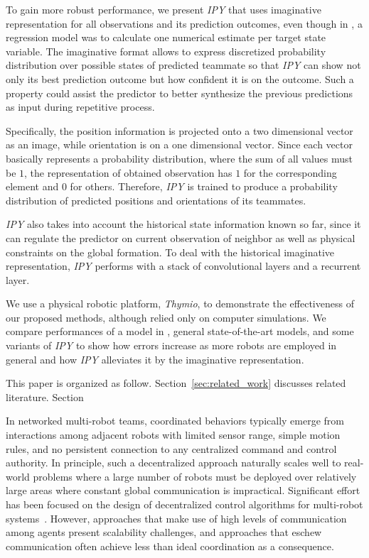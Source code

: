 \documentclass[letterpaper, 10 pt, conference]{ieeeconf}  %
\begin{document}
	To gain more robust performance, we present \emph{IPY} that uses imaginative representation 
	for all observations and its prediction outcomes, even though in \cite{Choi17}, 
	a regression model was to calculate one numerical estimate per target state variable. 
	The imaginative format allows to express discretized probability distribution 
	over possible states of predicted teammate so that \emph{IPY} can show not only its best
	prediction outcome but how confident it is on the outcome. 
	Such a property could assist the predictor to better synthesize the previous predictions as
	input during repetitive process.
	
	Specifically, the position information is projected onto a two
	dimensional vector as an image, while orientation is on a one dimensional vector.
	Since each vector basically represents a probability distribution, where the sum of all values 
	must be $1$, the representation of obtained observation has $1$ for the corresponding element
	and $0$ for others. Therefore, \emph{IPY} is trained to produce a probability distribution of 
	predicted positions and orientations of its teammates. 
	
	\emph{IPY} also takes into account the historical state information known so far, 
	since it can regulate the predictor on current observation of neighbor as well as
	physical constraints on the global formation. To deal with the historical imaginative 
	representation, \emph{IPY} performs with a stack of convolutional layers and a recurrent
	layer. 
		
	We use a physical robotic platform, \emph{Thymio}, to demonstrate the effectiveness of 
	our proposed methods, although \cite{Choi17} relied only on computer simulations.
	We compare performances of a model in \cite{Choi17}, general state-of-the-art models, 
	and some variants of \emph{IPY} to show how errors increase as more robots are employed in 
	general and how \emph{IPY} alleviates it by the imaginative representation. 
	
	This paper is organized as follow. 
	Section~\ref{sec:related_work} discusses related literature. 
	Section~
	
	In networked multi-robot teams, coordinated behaviors typically emerge
	from interactions among adjacent robots with limited sensor range,
	simple motion rules, and no persistent connection to any centralized
	command and control authority. In principle, such a decentralized
	approach naturally scales well to real-world problems where a large
	number of robots must be deployed over relatively large areas where
	constant global communication is impractical. Significant effort has
	been focused on the design of decentralized control algorithms for
	multi-robot systems~\cite{%
		WK02, %
		CM04, %
		OA10, %
		NK11, %
		BFBD13, %
		RCN14, %
		WPKBPB14, %
		DGRSST14, %
		YDJH15, %
		VHD15, %
		VH15, %
		EB16, %
		VFHD16%
	}. However,
	approaches that make use of high levels of communication among agents
	present scalability challenges, and approaches that eschew communication
	often achieve less than ideal coordination as a consequence.
	
\end{document}
